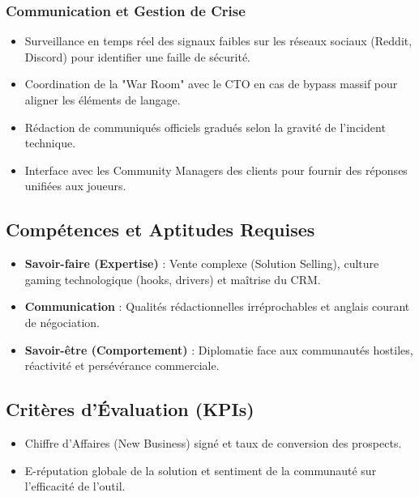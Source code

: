 \documentclass[12pt,a4paper]{article}
\begin{document}
\subsubsection{Communication et Gestion de Crise}
\begin{itemize}[label=\textbullet]
    \item Surveillance en temps réel des signaux faibles sur les réseaux sociaux (Reddit, Discord) pour identifier une faille de sécurité.
    \item Coordination de la "War Room" avec le CTO en cas de bypass massif pour aligner les éléments de langage.
    \item Rédaction de communiqués officiels gradués selon la gravité de l'incident technique.
    \item Interface avec les Community Managers des clients pour fournir des réponses unifiées aux joueurs.
\end{itemize}

\subsection{Compétences et Aptitudes Requises}
\begin{itemize}[label=\textbullet]
    \item \textbf{Savoir-faire (Expertise)} : Vente complexe (Solution Selling), culture gaming technologique (hooks, drivers) et maîtrise du CRM.
    \item \textbf{Communication} : Qualités rédactionnelles irréprochables et anglais courant de négociation.
    \item \textbf{Savoir-être (Comportement)} : Diplomatie face aux communautés hostiles, réactivité et persévérance commerciale.
\end{itemize}

\subsection{Critères d'Évaluation (KPIs)}
\begin{itemize}[label=\textbullet]
    \item Chiffre d'Affaires (New Business) signé et taux de conversion des prospects.
    \item E-réputation globale de la solution et sentiment de la communauté sur l'efficacité de l'outil.
\end{itemize}

\newpage

\end{document}
